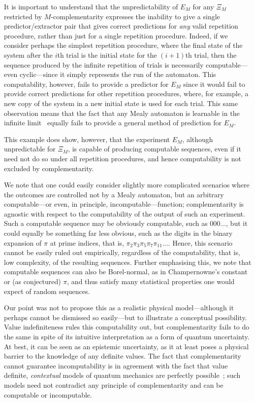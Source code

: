 \documentclass[information,article,submit,moreauthors,pdftex,12pt,a4paper]{mdpi}
\theoremstyle{mdpi}
\newcounter{ex}
\newcounter{re}
\theoremstyle{mdpidefinition}
\begin{document}
It is important to understand that the unpredictability of $E_M$ for any $\Xi_M$ restricted by $M$-complementarity expresses the inability to give a single predictor/extractor pair that gives correct predictions for \emph{any} valid repetition procedure, rather than just for a single repetition procedure.
Indeed, if we consider perhaps the simplest repetition procedure, where the final state of the system after the $i$th trial is the initial state for the $(i+1)$th trial, then the sequence produced by the infinite repetition of trials is necessarily computable---even cyclic---since it simply represents the run of the automaton.
This computability, however, fails to provide a predictor for $E_M$ since it would fail to provide correct predictions for other repetition procedures, where, for example, a new copy of the system in a new initial state is used for each trial.
This same observation means that the fact that any Mealy automaton is learnable in the infinite limit~\cite{Gold:1965qd} equally fails to provide a general method of prediction for $E_M$.

This example does show, however, that the experiment $E_M$, although unpredictable for $\Xi_M$, is capable of producing computable sequences, even if it need not do so under all repetition procedures, and hence computability is not excluded by complementarity.

We note that one could easily consider slightly more complicated scenarios where the outcomes are controlled not by a Mealy automaton, but an arbitrary computable---or even, in principle, incomputable---function; complementarity is agnostic with respect to the computability of the output of such an experiment.
Such a computable sequence may be  obviously computable, such as $000\dots$, but it could equally  be something far less obvious, such as the digits in the binary expansion of $\pi$ at prime indices, that is, $\pi_2\pi_3\pi_5\pi_7\pi_{11}\dots$.
Hence, this scenario cannot be easily ruled out empirically, regardless of the computability, that is,  low complexity, of the resulting sequences.
Further emphasising this, we note that computable sequences can also be Borel-normal, as in Champernowne's constant or (as conjectured) $\pi$, and thus satisfy many statistical properties one would expect of random sequences.

Our point was not to propose this as a realistic physical model---although it perhaps cannot be dismissed so easily---but to illustrate a conceptual possibility.
Value indefiniteness rules this computability out, but complementarity fails to do the same in spite of its intuitive interpretation as a form of quantum uncertainty.
At best, it can be seen as an epistemic uncertainty, as it at least poses a physical barrier to the knowledge of any definite values.
The fact that complementarity cannot guarantee incomputability is in agreement with the fact that value definite, \emph{contextual} models of quantum mechanics are perfectly possible~\cite{DBLP:conf/birthday/AbbottCS15,Bohm52}; such models need not contradict any principle of complementarity and can be computable or incomputable.
\end{document}
